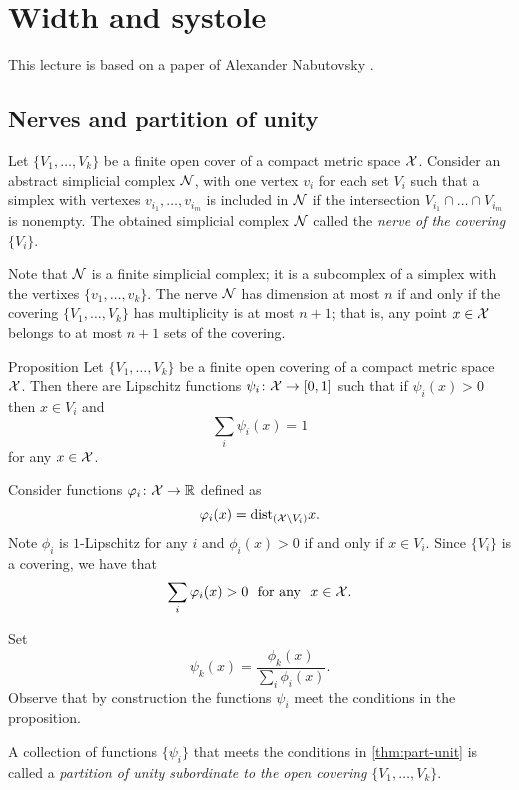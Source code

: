 \chapter{Width and systole}

This lecture is based on a paper of Alexander Nabutovsky \cite{nabutovsky}.

\section{Nerves and partition of unity}

Let $\{V_1,\dots,V_k\}$ be a finite open cover of a compact metric space $\mathcal{X}$.
Consider an abstract simplicial complex $\mathcal{N}$, with one vertex $v_i$ for each set $V_i$ such that a simplex with vertexes $v_{i_1},\dots, v_{i_m}$ is included in $\mathcal{N}$ if 
the intersection $V_{i_1}\cap\dots\cap V_{i_m}$ is nonempty.
The obtained simplicial complex $\mathcal{N}$ called the \emph{nerve of the covering $\{V_i\}$}.

Note that $\mathcal{N}$ is a finite simplicial complex;
it is a subcomplex of a simplex with the vertixes $\{v_1,\dots,v_k\}$.
The nerve $\mathcal{N}$ has dimension at most $n$ if and only if the covering $\{V_1,\dots,V_k\}$ has multiplicity is at most $n+1$;
that is, any point $x\in\mathcal{X}$ belongs to
at most $n+1$ sets of the covering.

\begin{thm}{Proposition}\label{thm:part-unit}
 Let $\{V_1,\dots,V_k\}$ be a finite open covering of a compact metric space ${\mathcal{X}}$.
Then there are Lipschitz functions $\psi_i\:{\spc{X}}\z\to[0,1]$ such that
if $\psi_i(x)>0$ then $x\in V_i$ and
$$\sum_i\psi_i(x)=1$$
for any $x\in {\mathcal{X}}$.
\end{thm}

Consider functions $\varphi_i\colon{\mathcal{X}}\to\mathbb{R}$ defined as
$$\varphi_i(x)=\mathrm{dist}_{({\mathcal{X}}\backslash V_i)} x.$$
Note $\phi_i$ is $1$-Lipschitz
for any $i$
and $\phi_i(x)>0$ if and only if $x\in V_i$.
Since $\{V_i\}$ is a covering, we have that
$$\sum_i\varphi_i(x)>0\ \ \text{for any}\ \ x\in {\mathcal{X}}.$$

Set 
$$\psi_k(x)=\frac{\phi_k(x)}{\sum_i\phi_i(x)}.$$
Observe that by construction the functions $\psi_i$ meet the conditions in the proposition.
\qedsf

A collection of functions $\{\psi_i\}$ that meets the conditions in \ref{thm:part-unit} is called 
a \emph{partition of unity subordinate to the open covering} $\{V_1,\dots,V_k\}$.

